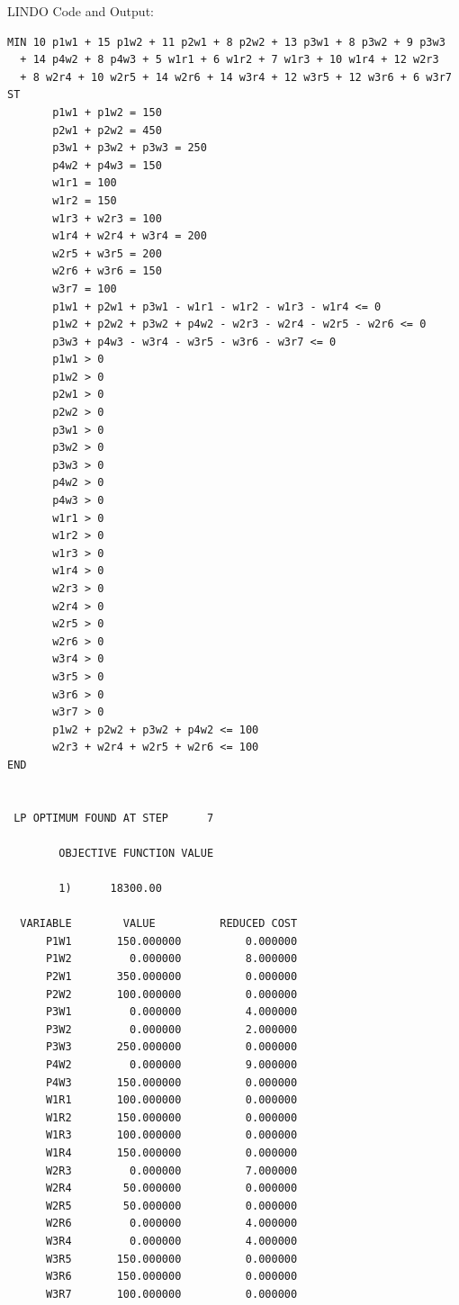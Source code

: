 \documentclass[paper=a4, fontsize=11pt]{scrartcl} %
\numberwithin{equation}{section} %
\numberwithin{figure}{section} %
\numberwithin{table}{section} %
\begin{document}
LINDO Code and Output:
\begin{verbatim}
MIN 10 p1w1 + 15 p1w2 + 11 p2w1 + 8 p2w2 + 13 p3w1 + 8 p3w2 + 9 p3w3 
  + 14 p4w2 + 8 p4w3 + 5 w1r1 + 6 w1r2 + 7 w1r3 + 10 w1r4 + 12 w2r3 
  + 8 w2r4 + 10 w2r5 + 14 w2r6 + 14 w3r4 + 12 w3r5 + 12 w3r6 + 6 w3r7
ST
	   p1w1 + p1w2 = 150
	   p2w1 + p2w2 = 450
	   p3w1 + p3w2 + p3w3 = 250
	   p4w2 + p4w3 = 150	
	   w1r1 = 100
	   w1r2 = 150
	   w1r3 + w2r3 = 100
	   w1r4 + w2r4 + w3r4 = 200	
	   w2r5 + w3r5 = 200
	   w2r6 + w3r6 = 150
	   w3r7 = 100
	   p1w1 + p2w1 + p3w1 - w1r1 - w1r2 - w1r3 - w1r4 <= 0 
	   p1w2 + p2w2 + p3w2 + p4w2 - w2r3 - w2r4 - w2r5 - w2r6 <= 0
	   p3w3 + p4w3 - w3r4 - w3r5 - w3r6 - w3r7 <= 0 
	   p1w1 > 0
	   p1w2 > 0
	   p2w1 > 0
	   p2w2 > 0
	   p3w1 > 0
	   p3w2 > 0
	   p3w3 > 0
	   p4w2 > 0
	   p4w3 > 0
	   w1r1 > 0
	   w1r2 > 0
	   w1r3 > 0
	   w1r4 > 0
	   w2r3 > 0
	   w2r4 > 0
	   w2r5 > 0
	   w2r6 > 0
	   w3r4 > 0
	   w3r5 > 0
	   w3r6 > 0
	   w3r7 > 0
	   p1w2 + p2w2 + p3w2 + p4w2 <= 100
	   w2r3 + w2r4 + w2r5 + w2r6 <= 100
END


 LP OPTIMUM FOUND AT STEP      7

        OBJECTIVE FUNCTION VALUE

        1)      18300.00

  VARIABLE        VALUE          REDUCED COST
      P1W1       150.000000          0.000000
      P1W2         0.000000          8.000000
      P2W1       350.000000          0.000000
      P2W2       100.000000          0.000000
      P3W1         0.000000          4.000000
      P3W2         0.000000          2.000000
      P3W3       250.000000          0.000000
      P4W2         0.000000          9.000000
      P4W3       150.000000          0.000000
      W1R1       100.000000          0.000000
      W1R2       150.000000          0.000000
      W1R3       100.000000          0.000000
      W1R4       150.000000          0.000000
      W2R3         0.000000          7.000000
      W2R4        50.000000          0.000000
      W2R5        50.000000          0.000000
      W2R6         0.000000          4.000000
      W3R4         0.000000          4.000000
      W3R5       150.000000          0.000000
      W3R6       150.000000          0.000000
      W3R7       100.000000          0.000000



\end{verbatim}
\end{document}

